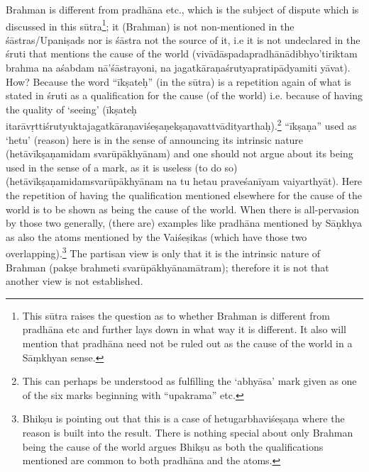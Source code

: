 
Brahman is different from pradhāna etc.,  which is the subject of dispute which is discussed in this sūtra\footnote{This sūtra raises the question as to whether Brahman is different from pradhāna etc and further lays down in what way it is different. It also will mention that pradhāna need not be ruled out as the cause of the world in a Sāṃkhyan sense.}; it (Brahman) is not non-men\-tioned in the śāstras/Upaniṣads nor is śāstra not the source of it, i.e it is not undeclared in the śruti that mentions the cause of the world (vivādāspadapradhānādibhyo’tiriktam brahma na aśabdam nā’śāstra\-yoni, na jagatkāraṇaśrutyapratipādyamiti yāvat). How? Because the word “īkṣateḥ” (in the sūtra) is a repetition again of what is stated in śruti as a qualification for the cause (of the world) i.e. because of having the quality of ‘seeing’ (īkṣateḥ itarāvṛttiśrutyuktajagatkāraṇaviśe\-ṣaṇekṣaṇavattvādityarthaḥ).\footnote{This can perhaps be understood as fulfilling the ‘abhyāsa’ mark given as one of the six marks beginning with “upakrama” etc.} “īkṣaṇa” used as  ‘hetu’ (reason) here is in the sense of announcing its intrinsic nature (hetāvīkṣaṇamidam svarūpākhyānam) and one should not argue about its being used in the sense of a mark, as it is useless (to do so) (hetāvīkṣaṇamidamsvarūpā\-khyānam na tu hetau praveśanīyam vaiyarthyāt). Here the repetition of having the qualification mentioned elsewhere for the cause of the world is to be shown as being the cause of the world. When there is all-pervasion by those two  generally, (there are) examples like pradhāna mentioned by Sāṇkhya as also the atoms mentioned by the Vaiśeṣikas (which have those two overlapping).\footnote{Bhikṣu is pointing out that this is a case of hetugarbhaviśeṣaṇa where the reason is built into the result. There is nothing special about only Brahman being the cause of the world argues Bhikṣu as both the qualifications mentioned are common to both pradhāna and the atoms.} The partisan view is only that it is the intrinsic nature of Brahman (pakṣe brahmeti svarūpākhyānamātram); therefore it is not that another view is not established.

